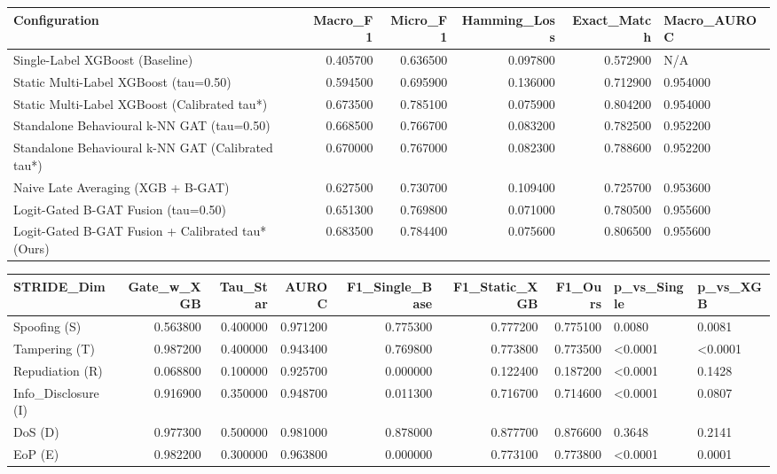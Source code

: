 \begin{tabular}{lrrrrl}
\toprule
Configuration & Macro_F1 & Micro_F1 & Hamming_Loss & Exact_Match & Macro_AUROC \\
\midrule
Single-Label XGBoost (Baseline) & 0.405700 & 0.636500 & 0.097800 & 0.572900 & N/A \\
Static Multi-Label XGBoost (tau=0.50) & 0.594500 & 0.695900 & 0.136000 & 0.712900 & 0.954000 \\
Static Multi-Label XGBoost (Calibrated tau*) & 0.673500 & 0.785100 & 0.075900 & 0.804200 & 0.954000 \\
Standalone Behavioural k-NN GAT (tau=0.50) & 0.668500 & 0.766700 & 0.083200 & 0.782500 & 0.952200 \\
Standalone Behavioural k-NN GAT (Calibrated tau*) & 0.670000 & 0.767000 & 0.082300 & 0.788600 & 0.952200 \\
Naive Late Averaging (XGB + B-GAT) & 0.627500 & 0.730700 & 0.109400 & 0.725700 & 0.953600 \\
Logit-Gated B-GAT Fusion (tau=0.50) & 0.651300 & 0.769800 & 0.071000 & 0.780500 & 0.955600 \\
Logit-Gated B-GAT Fusion + Calibrated tau* (Ours) & 0.683500 & 0.784400 & 0.075600 & 0.806500 & 0.955600 \\
\bottomrule
\end{tabular}


\begin{tabular}{lrrrrrrll}
\toprule
STRIDE_Dim & Gate_w_XGB & Tau_Star & AUROC & F1_Single_Base & F1_Static_XGB & F1_Ours & p_vs_Single & p_vs_XGB \\
\midrule
Spoofing (S) & 0.563800 & 0.400000 & 0.971200 & 0.775300 & 0.777200 & 0.775100 & 0.0080 & 0.0081 \\
Tampering (T) & 0.987200 & 0.400000 & 0.943400 & 0.769800 & 0.773800 & 0.773500 & <0.0001 & <0.0001 \\
Repudiation (R) & 0.068800 & 0.100000 & 0.925700 & 0.000000 & 0.122400 & 0.187200 & <0.0001 & 0.1428 \\
Info_Disclosure (I) & 0.916900 & 0.350000 & 0.948700 & 0.011300 & 0.716700 & 0.714600 & <0.0001 & 0.0807 \\
DoS (D) & 0.977300 & 0.500000 & 0.981000 & 0.878000 & 0.877700 & 0.876600 & 0.3648 & 0.2141 \\
EoP (E) & 0.982200 & 0.300000 & 0.963800 & 0.000000 & 0.773100 & 0.773800 & <0.0001 & 0.0001 \\
\bottomrule
\end{tabular}
